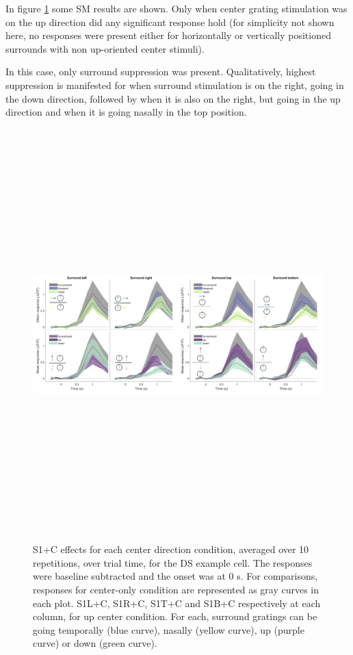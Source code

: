 In figure \ref{DSexamplecellSM} some SM results are shown. Only when center grating stimulation was on the up direction did any significant response hold (for simplicity not shown here, no responses were present either for horizontally or vertically positioned surrounds with non up-oriented center stimuli).

In this case, only surround suppression was present. Qualitatively, highest suppression is manifested for when surround stimulation is on the right, going in the down direction, followed by when it is also on the right, but going in the up direction and when it is going nasally in the top position.

\begin{figure}[H] \centering \includegraphics[width=15.9cm,height=15.9cm,keepaspectratio]{Figures/7.Results/individualSM/roi_29_mf379_pos5/3.png} 
\caption{S1+C effects for each center direction condition, averaged over 10 repetitions, over trial time, for the DS example cell. The responses were baseline subtracted and the onset was at 0 s. For comparisons, responses for center-only condition are represented as gray curves in each plot.
S1L+C, S1R+C, S1T+C and S1B+C respectively at each column, for up center condition. For each, surround gratings can be going temporally (blue curve), nasally (yellow curve), up (purple curve) or down (green curve).}
\label{DSexamplecellSM}
\end{figure}

